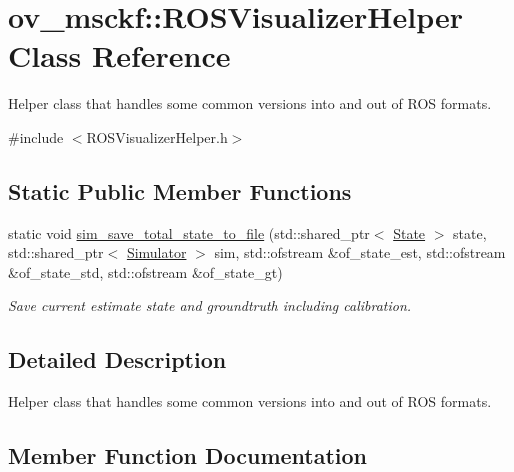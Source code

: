 \hypertarget{classov__msckf_1_1ROSVisualizerHelper}{}\section{ov\+\_\+msckf\+:\+:R\+O\+S\+Visualizer\+Helper Class Reference}
\label{classov__msckf_1_1ROSVisualizerHelper}


Helper class that handles some common versions into and out of R\+OS formats.  




{\ttfamily \#include $<$R\+O\+S\+Visualizer\+Helper.\+h$>$}

\subsection*{Static Public Member Functions}
\begin{DoxyCompactItemize}
\item 
static void \hyperlink{classov__msckf_1_1ROSVisualizerHelper_a1fc6dc217407639bac014a51ca944caf}{sim\+\_\+save\+\_\+total\+\_\+state\+\_\+to\+\_\+file} (std\+::shared\+\_\+ptr$<$ \hyperlink{classov__msckf_1_1State}{State} $>$ state, std\+::shared\+\_\+ptr$<$ \hyperlink{classov__msckf_1_1Simulator}{Simulator} $>$ sim, std\+::ofstream \&of\+\_\+state\+\_\+est, std\+::ofstream \&of\+\_\+state\+\_\+std, std\+::ofstream \&of\+\_\+state\+\_\+gt)
\begin{DoxyCompactList}\small\item\em Save current estimate state and groundtruth including calibration. \end{DoxyCompactList}\end{DoxyCompactItemize}


\subsection{Detailed Description}
Helper class that handles some common versions into and out of R\+OS formats. 

\subsection{Member Function Documentation}
\mbox{\label{classov__msckf_1_1ROSVisualizerHelper_a1fc6dc217407639bac014a51ca944caf}} 
